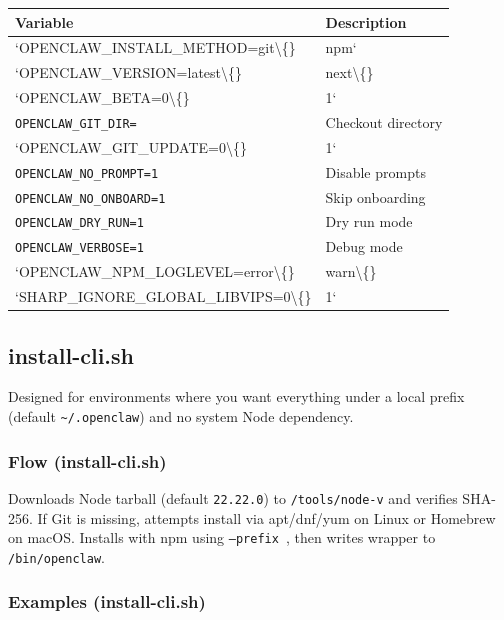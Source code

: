 \begin{table}[h]
\centering
\small
\begin{tabular}{|l|l|}
\hline
Variable & Description \\
\hline
`OPENCLAW\_INSTALL\_METHOD=git\textbackslash\{\} & npm` \\
\hline
`OPENCLAW\_VERSION=latest\textbackslash\{\} & next\textbackslash\{\} \\
\hline
`OPENCLAW\_BETA=0\textbackslash\{\} & 1` \\
\hline
\texttt{OPENCLAW\_GIT\_DIR=} & Checkout directory \\
\hline
`OPENCLAW\_GIT\_UPDATE=0\textbackslash\{\} & 1` \\
\hline
\texttt{OPENCLAW\_NO\_PROMPT=1} & Disable prompts \\
\hline
\texttt{OPENCLAW\_NO\_ONBOARD=1} & Skip onboarding \\
\hline
\texttt{OPENCLAW\_DRY\_RUN=1} & Dry run mode \\
\hline
\texttt{OPENCLAW\_VERBOSE=1} & Debug mode \\
\hline
`OPENCLAW\_NPM\_LOGLEVEL=error\textbackslash\{\} & warn\textbackslash\{\} \\
\hline
`SHARP\_IGNORE\_GLOBAL\_LIBVIPS=0\textbackslash\{\} & 1` \\
\hline
\end{tabular}
\end{table}




\hrulefill


\subsection{install-cli.sh}


Designed for environments where you want everything under a local prefix (default \texttt{\textasciitilde{}/.openclaw}) and no system Node dependency.

\subsubsection{Flow (install-cli.sh)}


Downloads Node tarball (default \texttt{22.22.0}) to \texttt{/tools/node-v} and verifies SHA-256.
If Git is missing, attempts install via apt/dnf/yum on Linux or Homebrew on macOS.
Installs with npm using \texttt{--prefix }, then writes wrapper to \texttt{/bin/openclaw}.

\subsubsection{Examples (install-cli.sh)}


